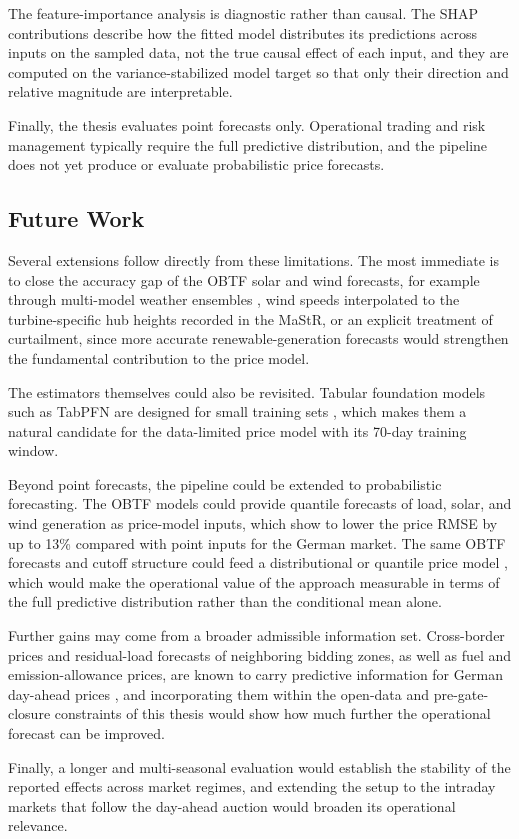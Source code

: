 The feature-importance analysis is diagnostic rather than causal. The SHAP
contributions describe how the fitted model distributes its predictions across
inputs on the sampled data, not the true causal effect of each input, and they
are computed on the variance-stabilized model target so that only their direction
and relative magnitude are interpretable.

Finally, the thesis evaluates point forecasts only. Operational trading and risk
management typically require the full predictive distribution, and the pipeline
does not yet produce or evaluate probabilistic price forecasts.

\subsection{Future Work}

Several extensions follow directly from these limitations. The most immediate is
to close the accuracy gap of the OBTF solar and wind forecasts, for
example through multi-model weather ensembles \cite{bruninx2026windensembles}, wind speeds interpolated to the
turbine-specific hub heights recorded in the MaStR, or an
explicit treatment of curtailment, since more accurate renewable-generation forecasts would
strengthen the fundamental contribution to the price model.

The estimators themselves could also be revisited. Tabular
foundation models such as TabPFN are designed for small training sets
\cite{hollmann2025tabpfn}, which makes them a natural candidate for the
data-limited price model with its 70-day training window.

Beyond point forecasts, the pipeline could be extended to probabilistic
forecasting. The OBTF models could provide quantile forecasts of load, solar, and
wind generation as price-model inputs, which \textcite{uniejewski2026probabilistic}
show to lower the price RMSE by up to 13\% compared with point inputs for the
German market. The same OBTF forecasts and cutoff structure could feed a
distributional or quantile price model \cite{marcjasz2023distributional}, which would make the operational value of
the approach measurable in terms of the full predictive distribution rather than
the conditional mean alone.

Further gains may come from a broader admissible information set. Cross-border
prices and residual-load forecasts of neighboring bidding zones, as well as fuel
and emission-allowance prices, are known to carry predictive information for
German day-ahead prices
\cite{trebbien2023probabilistic,hilger2024multivariate,pape2016fundamentals},
and incorporating them within the open-data and
pre-gate-closure constraints of this thesis would show how much further the
operational forecast can be improved.

Finally, a longer and multi-seasonal evaluation would establish the stability of
the reported effects across market regimes, and extending the setup to the
intraday markets that follow the day-ahead auction would broaden its operational
relevance.
